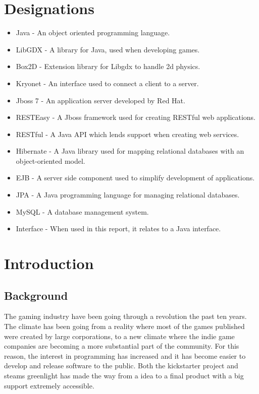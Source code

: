 \documentclass[11pt]{report}
\begin{document}
\section{Designations}
\begin{itemize}
\item{Java - An object oriented programming language.}
\item{LibGDX - A library for Java, used when developing games.}
\item{Box2D - Extension library for Libgdx to handle 2d physics.}
\item{Kryonet - An interface used to connect a client to a server.}
\item{Jboss 7 - An application server developed by Red Hat.}
\item{RESTEasy - A Jboss framework used for creating RESTful web applications.}
\item{RESTful - A Java API which lends support when creating web services.}
\item{Hibernate - A Java library used for mapping relational databases with an object-oriented model.}
\item{EJB - A server side component used to simplify development of applications.}
\item{JPA - A Java programming language for managing relational databases.}
\item{MySQL - A database management system.}
\item{Interface - When used in this report, it relates to a Java interface.}
\end{itemize}
\section{Introduction}
\subsection{Background}

The gaming industry have been going through a revolution the past ten years. The climate has been going from a reality where most of the games published were created by large corporations, to a new climate where the indie game companies are becoming a more substantial part of the community. For this reason, the interest in programming has increased and it has become easier to develop and release software to the public. Both the kickstarter project and steams greenlight has made the way from a idea to a final product with a big support extremely accessible.
\end{document}
